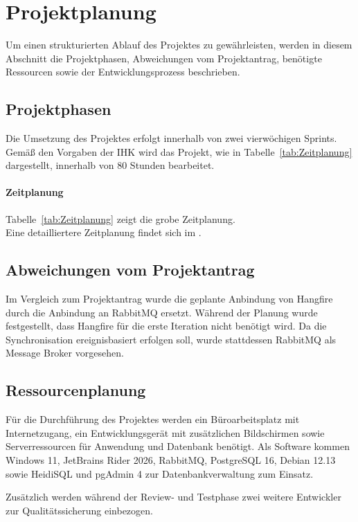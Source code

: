 \section{Projektplanung} 
\label{sec:Projektplanung}
Um einen strukturierten Ablauf des Projektes zu gewährleisten, werden in diesem Abschnitt
die Projektphasen, Abweichungen vom Projektantrag, benötigte Ressourcen sowie der Entwicklungsprozess beschrieben.

\subsection{Projektphasen}
\label{sec:Projektphasen}
Die Umsetzung des Projektes erfolgt innerhalb von zwei vierwöchigen Sprints.
Gemäß den Vorgaben der IHK wird das Projekt, wie in Tabelle~\ref{tab:Zeitplanung} dargestellt,
innerhalb von 80 Stunden bearbeitet.

\paragraph{Zeitplanung}
Tabelle~\ref{tab:Zeitplanung} zeigt die grobe Zeitplanung.
\\
Eine detailliertere Zeitplanung findet sich im .

\subsection{Abweichungen vom Projektantrag}
\label{sec:AbweichungenProjektantrag}
Im Vergleich zum Projektantrag wurde die geplante Anbindung von Hangfire durch die Anbindung an RabbitMQ ersetzt.
Während der Planung wurde festgestellt, dass Hangfire für die erste Iteration nicht benötigt wird.
Da die Synchronisation ereignisbasiert erfolgen soll, wurde stattdessen RabbitMQ als Message Broker vorgesehen.

\subsection{Ressourcenplanung}
\label{sec:Ressourcenplanung}
Für die Durchführung des Projektes werden ein Büroarbeitsplatz mit Internetzugang,
ein Entwicklungsgerät mit zusätzlichen Bildschirmen sowie Serverressourcen für Anwendung und Datenbank benötigt.
Als Software kommen Windows 11, JetBrains Rider 2026, RabbitMQ, PostgreSQL 16,
Debian 12.13 sowie HeidiSQL und pgAdmin 4 zur Datenbankverwaltung zum Einsatz.
\par\smallskip
Zusätzlich werden während der Review- und Testphase zwei weitere Entwickler zur Qualitätssicherung einbezogen.

